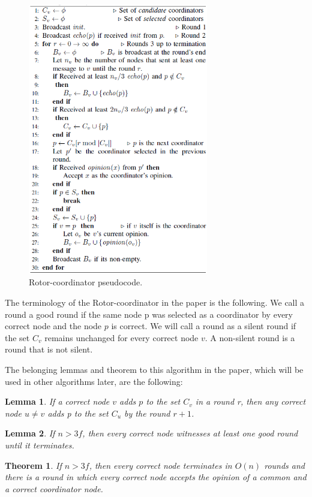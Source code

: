 \documentclass{article}
\newtheorem{theorem}{Theorem}[section]
\newtheorem{lemma}{Lemma}[section]
\begin{document}
\begin{figure}[hbt!]
    \centering
    \includegraphics[width=0.70\textwidth]{figures/rotor_coordinator.png}
    \caption{Rotor-coordinator pseudocode.\label{rotor_coordinator_fig}}
\end{figure}

The terminology of the Rotor-coordinator in the paper is the following. We call a round a good round if the same node p was selected as a coordinator by every correct node and the node \(p\) is correct. We will call a round as a silent round if the set \(C_v\) remains unchanged for every correct node \(v\). A non-silent round is a round that is not silent.

The belonging lemmas and theorem to this algorithm in the paper, which will be used in other algorithms later, are the following:
\begin{lemma}
If a correct node \(v\) adds \(p\) to the set \(C_v\) in a round r, then any correct node \(u \neq v\) adds p to the set \(C_u\) by the round \(r + 1\).
\end{lemma}
\begin{lemma}
If \(n > 3f\), then every correct node witnesses at least one good round until it terminates.
\end{lemma}
\begin{theorem}
If \(n > 3f\), then every correct node terminates in \(O(n)\) rounds and there is a round in which every correct node accepts the opinion of a common and a correct coordinator node.
\end{theorem}
\end{document}
